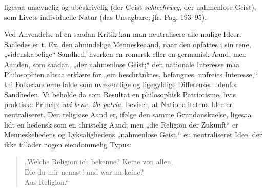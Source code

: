 \documentclass[12pt]{book}
\begin{document}
ligesaa unævnelig og ubeskrivelig (der Geist \emph{schlechtweg}, der nahmenlose
Geist), som Livets individuelle Natur (das Unsagbare; jfr. Pag. 193--95).

Ved Anvendelse af en saadan Kritik kan man neutralisere alle mulige Ideer. Saaledes
er t. Ex. den almindelige Menneskeaand, naar den opfattes i sin rene,
„videnskabelige“ Sandhed, hverken en romersk eller en germanisk Aand, men Aanden,
som saadan, „der nahmenlose Geist;“ den nationale Interesse maa Philosophien altsaa
erklære for „ein beschränktes, befangnes, unfreies Interesse,“ thi Folkeaanderne
falde som uvæsentlige og ligegyldige Differenser udenfor Sandheden. Vi beholde da
som Resultat en philosophisk Patriotisme, hvis praktiske Princip:
\textit{ubi bene, ibi patria,} beviser, at Nationalitetens Idee er neutraliseret.
Den religiøse Aand er, ifølge den samme Grundanskuelse, ligesaa lidt en hedensk som
en christelig Aand; men „die Religion der Zukunft“ er Menneskehedens og
Lyksalighedens „nahmenlose Geist,“ en neutraliseret Idee, der ikke tillader nogen
eiendommelig Typus:

\begin{verse}
\small
„Welche Religion ich bekenne? Keine von allen,\\
Die du mir nennst! und warum keine?\\
\hspace*{4em}Aus Religion.“
\end{verse}
\end{document}
